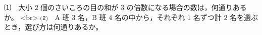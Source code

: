 ⑴　大小 $2$ 個のさいころの目の和が $3$ の倍数になる場合の数は，何通りあるか。 <br>
⑵　$\mathrm{A}$ 班 $3$ 名，$\mathrm{B}$ 班 $4$ 名の中から，それぞれ $1$ 名ずつ計 $2$ 名を選ぶとき，選び方は何通りあるか。
